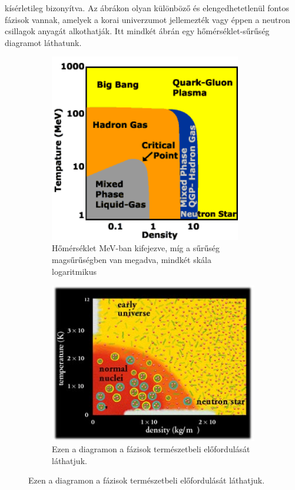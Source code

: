 \documentclass[a4paper,12pt]{article}
\begin{document}
kísérletileg bizonyítva. Az ábrákon olyan különböző és elengedhetetlenül fontos fázisok vannak, amelyek a korai univerzumot jellemezték vagy éppen
a neutron csillagok anyagát alkothatják. Itt mindkét ábrán egy hőmérséklet-sűrűség diagramot láthatunk.
\begin{figure}[H]
	\centering
	\begin{subfigure}{.49\textwidth}
		\centering
		\includegraphics[width=0.92\textwidth]{cbm_phase1.png}
		\caption{ Hőmérséklet MeV-ban kifejezve, míg a sűrűség magsűrűségben van megadva, mindkét skála logaritmikus }
	\end{subfigure}
	\begin{subfigure}{.49\textwidth}
		\includegraphics[width=.92\textwidth]{cbm_phase2.jpg}
		\caption{ Ezen a diagramon a fázisok természetbeli előfordulását láthatjuk. }
	\end{subfigure}
\end{figure}
\end{document}

